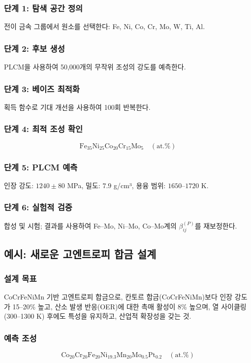 \documentclass[12pt,a4paper]{article}
\begin{document}
	\subsubsection{단계 1: 탐색 공간 정의}
	전이 금속 그룹에서 원소를 선택한다: Fe, Ni, Co, Cr, Mo, W, Ti, Al.
	
	\subsubsection{단계 2: 후보 생성}
	PLCM을 사용하여 50,000개의 무작위 조성의 강도를 예측한다.
	
	\subsubsection{단계 3: 베이즈 최적화}
	획득 함수로 기대 개선을 사용하여 100회 반복한다.
	
	\subsubsection{단계 4: 최적 조성 확인}
	\[
	\text{Fe}_{35}\text{Ni}_{25}\text{Co}_{20}\text{Cr}_{15}\text{Mo}_{5} \quad (\text{at.}\%)
	\]
	
	\subsubsection{단계 5: PLCM 예측}
	인장 강도: \(1240 \pm 80\) MPa, 밀도: \(7.9\) g/cm³, 용융 범위: \(1650\)–\(1720\) K.
	
	\subsubsection{단계 6: 실험적 검증}
	합성 및 시험; 결과를 사용하여 Fe–Mo, Ni–Mo, Co–Mo계의 \(\beta_{ij}^{(P)}\)를 재보정한다.
	
	\subsection{예시: 새로운 고엔트로피 합금 설계}
	
	\subsubsection{설계 목표}
	CoCrFeNiMn 기반 고엔트로피 합금으로, 칸토르 합금(CoCrFeNiMn)보다 인장 강도가 15–20\% 높고, 산소 발생 반응(OER)에 대한 촉매 활성이 8\% 높으며, 열 사이클링(300–1300 K) 후에도 특성을 유지하고, 산업적 확장성을 갖는 것.
	
	\subsubsection{예측 조성}
	\[
	\text{Co}_{20}\text{Cr}_{20}\text{Fe}_{20}\text{Ni}_{19.3}\text{Mn}_{20}\text{Mo}_{0.5}\text{Pt}_{0.2}\quad (\text{at.}\%)
	\]
	
\end{document}
